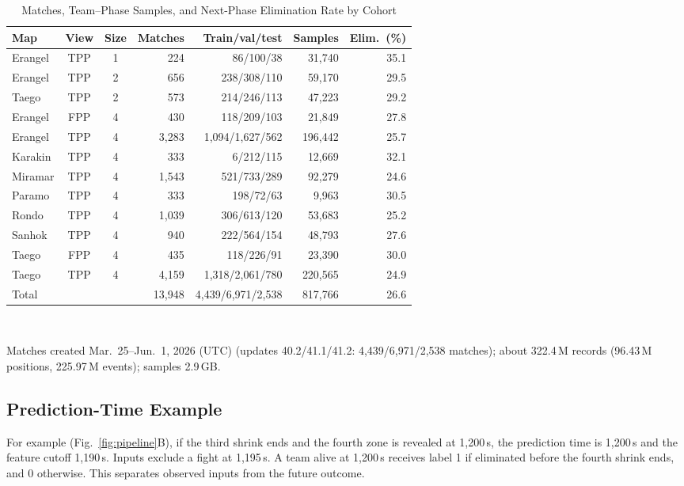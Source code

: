 \documentclass[sigconf,anonymous,nonacm]{acmart}
\begin{document}
\begin{table}[t]
\centering
\caption{Matches, Team--Phase Samples, and Next-Phase Elimination Rate by Cohort}
\label{tab:cohorts}
\footnotesize
\setlength{\tabcolsep}{2.7pt}
\begin{tabular}{lccrrrr}
\hline
Map & View & Size & Matches & Train/val/test & Samples & Elim.\ (\%) \\
\hline
Erangel & TPP & 1 & 224 & 86/100/38 & 31,740 & 35.1 \\
Erangel & TPP & 2 & 656 & 238/308/110 & 59,170 & 29.5 \\
Taego & TPP & 2 & 573 & 214/246/113 & 47,223 & 29.2 \\
Erangel & FPP & 4 & 430 & 118/209/103 & 21,849 & 27.8 \\
Erangel & TPP & 4 & 3,283 & 1,094/1,627/562 & 196,442 & 25.7 \\
Karakin & TPP & 4 & 333 & 6/212/115 & 12,669 & 32.1 \\
Miramar & TPP & 4 & 1,543 & 521/733/289 & 92,279 & 24.6 \\
Paramo & TPP & 4 & 333 & 198/72/63 & 9,963 & 30.5 \\
Rondo & TPP & 4 & 1,039 & 306/613/120 & 53,683 & 25.2 \\
Sanhok & TPP & 4 & 940 & 222/564/154 & 48,793 & 27.6 \\
Taego & FPP & 4 & 435 & 118/226/91 & 23,390 & 30.0 \\
Taego & TPP & 4 & 4,159 & 1,318/2,061/780 & 220,565 & 24.9 \\
\hline
Total & & & 13,948 & 4,439/6,971/2,538 & 817,766 & 26.6 \\
\hline
\end{tabular}
\\[2pt]
\parbox{\columnwidth}{\scriptsize Matches created Mar.~25--Jun.~1, 2026 (UTC) (updates 40.2/41.1/41.2: 4,439/6,971/2,538 matches); about 322.4\,M records (96.43\,M positions, 225.97\,M events); samples 2.9\,GB.}
\end{table}

\subsection{Prediction-Time Example}
\label{sec:method:samples}
For example (Fig.~\ref{fig:pipeline}B), if the third shrink ends and the fourth zone is revealed at 1,200\,s, the prediction time is 1,200\,s and the feature cutoff 1,190\,s. Inputs exclude a fight at 1,195\,s. A team alive at 1,200\,s receives label 1 if eliminated before the fourth shrink ends, and 0 otherwise. This separates observed inputs from the future outcome.
\end{document}

